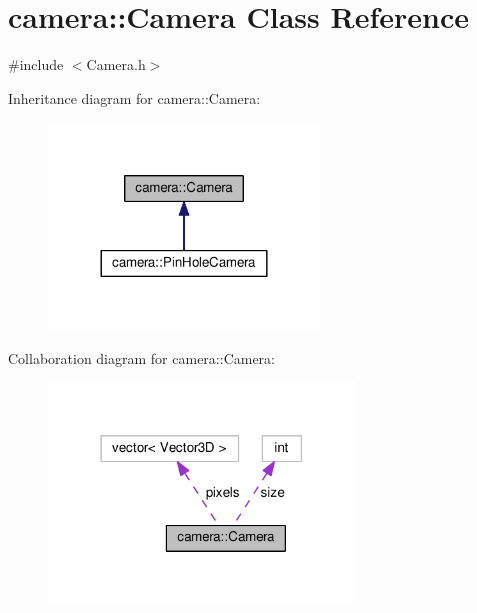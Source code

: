 \hypertarget{classcamera_1_1Camera}{}\section{camera\+:\+:Camera Class Reference}
\label{classcamera_1_1Camera}


{\ttfamily \#include $<$Camera.\+h$>$}



Inheritance diagram for camera\+:\+:Camera\+:\nopagebreak
\begin{figure}[H]
\begin{center}
\leavevmode
\includegraphics[width=204pt]{classcamera_1_1Camera__inherit__graph}
\end{center}
\end{figure}


Collaboration diagram for camera\+:\+:Camera\+:\nopagebreak
\begin{figure}[H]
\begin{center}
\leavevmode
\includegraphics[width=230pt]{classcamera_1_1Camera__coll__graph}
\end{center}
\end{figure}
